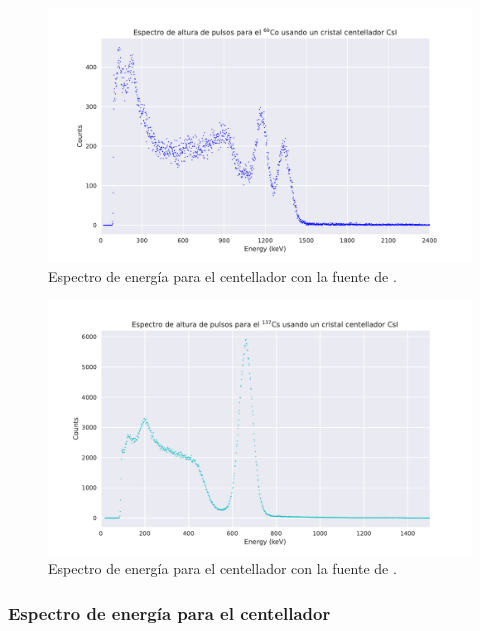 \documentclass[12pt]{article}
\begin{document}
    \begin{figure}[!htb]
        \centering
        \includegraphics[scale = 0.7]{energy_spectrum_CsICo.pdf}
        \caption{Espectro de energía para el centellador  con la fuente de .}
        \label{fig:csiCoSpectrum}
    \end{figure}

    \begin{figure}[!htb]
        \centering
        \includegraphics[scale = 0.7]{energy_spectrum_CsICs.pdf}
        \caption{Espectro de energía para el centellador  con la fuente de .}
        \label{fig:csiCsSpectrum}
    \end{figure}

    \subsubsection*{Espectro de energía para el centellador }
\end{document}
